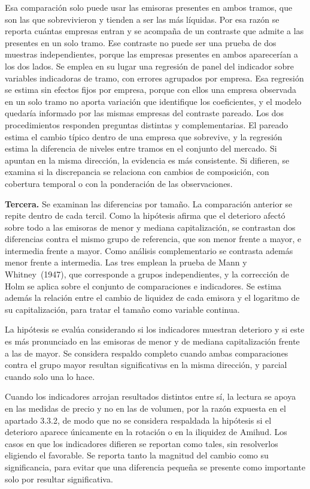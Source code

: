 Esa comparación solo puede usar las emisoras presentes en ambos tramos, que son las que sobrevivieron y tienden a ser las más líquidas. Por esa razón se reporta cuántas empresas entran y se acompaña de un contraste que admite a las presentes en un solo tramo. Ese contraste no puede ser una prueba de dos muestras independientes, porque las empresas presentes en ambos aparecerían a los dos lados. Se emplea en su lugar una regresión de panel del indicador sobre variables indicadoras de tramo, con errores agrupados por empresa. Esa regresión se estima sin efectos fijos por empresa, porque con ellos una empresa observada en un solo tramo no aporta variación que identifique los coeficientes, y el modelo quedaría informado por las mismas empresas del contraste pareado. Los dos procedimientos responden preguntas distintas y complementarias. El pareado estima el cambio típico dentro de una empresa que sobrevive, y la regresión estima la diferencia de niveles entre tramos en el conjunto del mercado. Si apuntan en la misma dirección, la evidencia es más consistente. Si difieren, se examina si la discrepancia se relaciona con cambios de composición, con cobertura temporal o con la ponderación de las observaciones.

\textbf{Tercera.} Se examinan las diferencias por tamaño. La comparación anterior se repite dentro de cada tercil. Como la hipótesis afirma que el deterioro afectó sobre todo a las emisoras de menor y mediana capitalización, se contrastan dos diferencias contra el mismo grupo de referencia, que son menor frente a mayor, e intermedia frente a mayor. Como análisis complementario se contrasta además menor frente a intermedia. Las tres emplean la prueba de Mann y Whitney~(1947), que corresponde a grupos independientes, y la corrección de Holm se aplica sobre el conjunto de comparaciones e indicadores. Se estima además la relación entre el cambio de liquidez de cada emisora y el logaritmo de su capitalización, para tratar el tamaño como variable continua.

La hipótesis se evalúa considerando si los indicadores muestran deterioro y si este es más pronunciado en las emisoras de menor y de mediana capitalización frente a las de mayor. Se considera respaldo completo cuando ambas comparaciones contra el grupo mayor resultan significativas en la misma dirección, y parcial cuando solo una lo hace.

Cuando los indicadores arrojan resultados distintos entre sí, la lectura se apoya en las medidas de precio y no en las de volumen, por la razón expuesta en el apartado 3.3.2, de modo que no se considera respaldada la hipótesis si el deterioro aparece únicamente en la rotación o en la iliquidez de Amihud. Los casos en que los indicadores difieren se reportan como tales, sin resolverlos eligiendo el favorable. Se reporta tanto la magnitud del cambio como su significancia, para evitar que una diferencia pequeña se presente como importante solo por resultar significativa.

